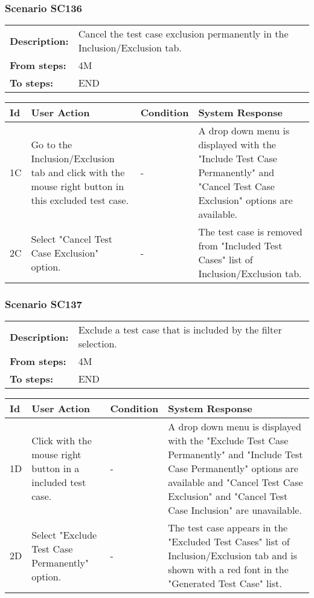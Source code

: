 \documentclass[a4paper,11pt]{article}
\newcommand{\bl}{\\ \hline}
\begin{document}
\subsubsection*{Scenario SC136}
\begin{tabular}{p{1in}p{4in}}
{\bf Description:} & Cancel the test case exclusion permanently in the
					Inclusion/Exclusion tab. \\
{\bf From steps:} & 4M \\
{\bf To steps:} & END \\
\end{tabular}
 
\begin{tabular}{|p{0.8in}|p{1.6in}|p{1.6in}|p{1.6in}|}
\hline
Id & User Action & Condition & System Response  \bl 
1C & Go to the Inclusion/Exclusion tab and click with the mouse
						right button in this excluded test case. & - & A drop down menu is displayed with the "Include Test Case
						Permanently" and "Cancel Test Case Exclusion" options are
						available. \bl 
2C & Select "Cancel Test Case Exclusion" option. & - & The test case is removed from "Included Test Cases" list
						of Inclusion/Exclusion tab. \bl 
\end{tabular}
\subsubsection*{Scenario SC137}
\begin{tabular}{p{1in}p{4in}}
{\bf Description:} & Exclude a test case that is included by the filter
					selection. \\
{\bf From steps:} & 4M \\
{\bf To steps:} & END \\
\end{tabular}
 
\begin{tabular}{|p{0.8in}|p{1.6in}|p{1.6in}|p{1.6in}|}
\hline
Id & User Action & Condition & System Response  \bl 
1D & Click with the mouse right button in a included test case.
					 & - & A drop down menu is displayed with the "Exclude Test Case
						Permanently" and "Include Test Case Permanently" options are
						available and "Cancel Test Case Exclusion" and "Cancel Test Case
						Inclusion" are unavailable. \bl 
2D & Select "Exclude Test Case Permanently" option. & - & The test case appears in the "Excluded Test Cases" list
						of Inclusion/Exclusion tab and is shown with a red font in the
						"Generated Test Case" list. \bl 
\end{tabular}
\end{document}
